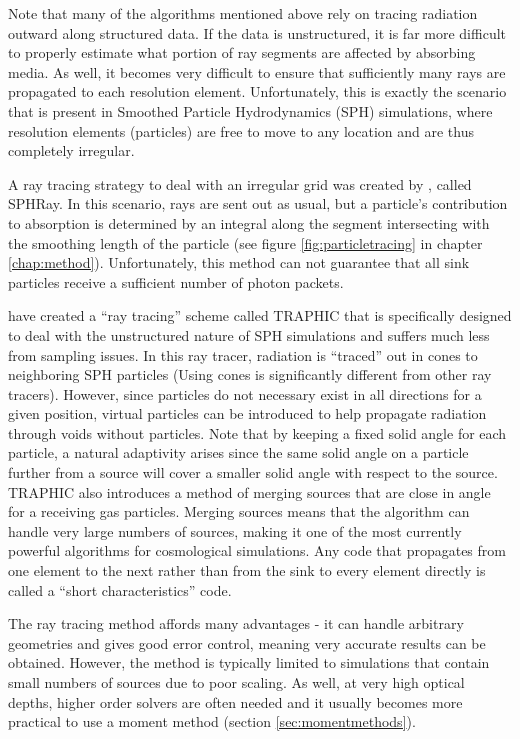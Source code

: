 Note that many of the algorithms mentioned above rely on tracing radiation outward along structured data. If the data is unstructured, it is far more difficult to properly estimate what portion of ray segments are affected by absorbing media. As well, it becomes very difficult to ensure that sufficiently many rays are propagated to each resolution element. Unfortunately, this is exactly the scenario that is present in Smoothed Particle Hydrodynamics (SPH) simulations, where resolution elements (particles) are free to move to any location and are thus completely irregular.

A ray tracing strategy to deal with an irregular grid was created by \citet{altayEt08}, called SPHRay. In this scenario, rays are sent out as usual, but a particle's contribution to absorption is determined by an integral along the segment intersecting with the smoothing length of the particle (see figure \ref{fig:particletracing} in chapter \ref{chap:method}). Unfortunately, this method can not guarantee that all sink particles receive a sufficient number of photon packets.

\citet{pawlikSchaye08} have created a ``ray tracing'' scheme called TRAPHIC that is specifically designed to deal with the unstructured nature of SPH simulations and suffers much less from sampling issues. In this ray tracer, radiation is ``traced'' out in cones to neighboring SPH particles (Using cones is significantly different from other ray tracers). However, since particles do not necessary exist in all directions for a given position, virtual particles can be introduced to help propagate radiation through voids without particles. Note that by keeping a fixed solid angle for each particle, a natural adaptivity arises since the same solid angle on a particle further from a source will cover a smaller solid angle with respect to the source. TRAPHIC also introduces a method of merging sources that are close in angle for a receiving gas particles. Merging sources means that the algorithm can handle very large numbers of sources, making it one of the most currently powerful algorithms for cosmological simulations. Any code that propagates from one element to the next rather than from the sink to every element directly is called a ``short characteristics'' code.

The ray tracing method affords many advantages - it can handle arbitrary geometries and gives good error control, meaning very accurate results can be obtained. However, the method is typically limited to simulations that contain small numbers of sources due to poor scaling. As well, at very high optical depths, higher order solvers are often needed and it usually becomes more practical to use a moment method (section \ref{sec:momentmethods}).


